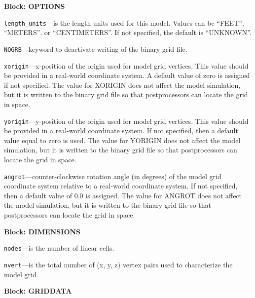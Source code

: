 
\item \textbf{Block: OPTIONS}

\begin{description}
\item \texttt{length\_units}---is the length units used for this model.  Values can be ``FEET'', ``METERS'', or ``CENTIMETERS''.  If not specified, the default is ``UNKNOWN''.

\item \texttt{NOGRB}---keyword to deactivate writing of the binary grid file.

\item \texttt{xorigin}---x-position of the origin used for model grid vertices.  This value should be provided in a real-world coordinate system.  A default value of zero is assigned if not specified.  The value for XORIGIN does not affect the model simulation, but it is written to the binary grid file so that postprocessors can locate the grid in space.

\item \texttt{yorigin}---y-position of the origin used for model grid vertices.  This value should be provided in a real-world coordinate system.  If not specified, then a default value equal to zero is used.  The value for YORIGIN does not affect the model simulation, but it is written to the binary grid file so that postprocessors can locate the grid in space.

\item \texttt{angrot}---counter-clockwise rotation angle (in degrees) of the model grid coordinate system relative to a real-world coordinate system.  If not specified, then a default value of 0.0 is assigned.  The value for ANGROT does not affect the model simulation, but it is written to the binary grid file so that postprocessors can locate the grid in space.

\end{description}
\item \textbf{Block: DIMENSIONS}

\begin{description}
\item \texttt{nodes}---is the number of linear cells.

\item \texttt{nvert}---is the total number of (x, y, z) vertex pairs used to characterize the model grid.

\end{description}
\item \textbf{Block: GRIDDATA}

